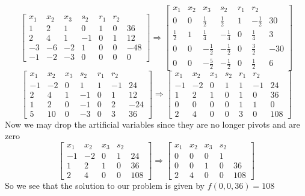 \documentclass[12pt]{article}
\begin{document}
\[
\left[ \begin{array} {lll|l|ll|l}
x_1 & x_2 & x_3  & s_2 & r_1 &r_2\\
\hline
1&2&1&0&1&0&36\\
2&4&1&-1&0&1&12\\
\hline
-3&-6&-2&1&0&0&-48\\
-1&-2&-3&0&0&0&0
\end{array}\right]
\Rightarrow
\left[ \begin{array} {lll|l|ll|l}
x_1 & x_2 & x_3  & s_2 & r_1 &r_2\\
\hline
0&0&\frac{1}{2}&\frac{1}{2}&1&-\frac{1}{2}&30\\
\frac{1}{2}&1&\frac{1}{4}&-\frac{1}{4}&0&\frac{1}{4}&3\\
\hline
0&0&-\frac{1}{2}&-\frac{1}{2}&0&\frac{3}{2}&-30\\
0&0&-\frac{5}{2}&-\frac{1}{2}&0&\frac{1}{2}&6
\end{array}\right]
\]
\[
\left[ \begin{array} {lll|l|ll|l}
x_1 & x_2 & x_3  & s_2 & r_1 &r_2\\
\hline
-1&-2&0&1&1&-1&24\\
2&4&1&-1&0&1&12\\
\hline
1&2&0&-1&0&2&-24\\
5&10&0&-3&0&3&36
\end{array}\right]
\Rightarrow
\left[ \begin{array} {lll|l|ll|l}
x_1 & x_2 & x_3  & s_2 & r_1 &r_2\\
\hline
-1&-2&0&1&1&-1&24\\
1&2&1&0&1&0&36\\
\hline
0&0&0&0&1&1&0\\
2&4&0&0&3&0&108
\end{array}\right]
\]
Now we may drop the artificial variables since they are no longer pivots and are zero
\[
\left[ \begin{array} {lll|l|l}
x_1 & x_2 & x_3  & s_2 \\
\hline
-1&-2&0&1&24\\
1&2&1&0&36\\
\hline
2&4&0&0&108
\end{array}\right]
\Rightarrow
\left[ \begin{array} {lll|l|l}
x_1 & x_2 & x_3  & s_2 \\
\hline
0&0&0&1&\\
0&0&1&0&36\\
\hline
2&4&0&0&108
\end{array}\right]
\]
So we see that the solution to our problem is given by $f(0,0,36)=108$
\end{document}
